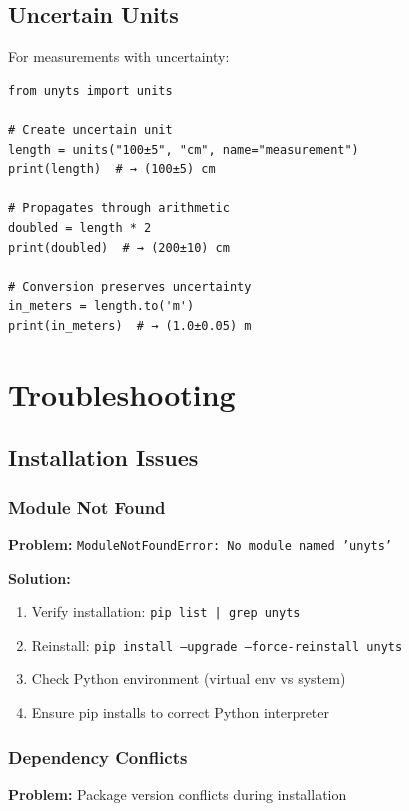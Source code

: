 \documentclass[11pt,a4paper]{report}
\begin{document}
\section{Uncertain Units}

For measurements with uncertainty:

\begin{lstlisting}[style=pythonstyle]
from unyts import units

# Create uncertain unit
length = units("100±5", "cm", name="measurement")
print(length)  # → (100±5) cm

# Propagates through arithmetic
doubled = length * 2
print(doubled)  # → (200±10) cm

# Conversion preserves uncertainty
in_meters = length.to('m')
print(in_meters)  # → (1.0±0.05) m
\end{lstlisting}


\chapter{Troubleshooting}

\section{Installation Issues}

\subsection{Module Not Found}

\textbf{Problem:} \texttt{ModuleNotFoundError: No module named 'unyts'}

\textbf{Solution:}
\begin{enumerate}
\item Verify installation: \texttt{pip list | grep unyts}
\item Reinstall: \texttt{pip install --upgrade --force-reinstall unyts}
\item Check Python environment (virtual env vs system)
\item Ensure pip installs to correct Python interpreter
\end{enumerate}

\subsection{Dependency Conflicts}

\textbf{Problem:} Package version conflicts during installation
\end{document}
